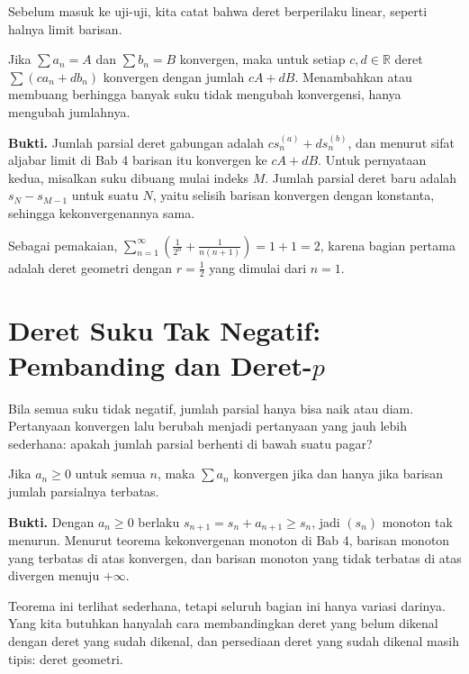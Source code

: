 Sebelum masuk ke uji-uji, kita catat bahwa deret berperilaku linear, seperti halnya
limit barisan.

\begin{proposisi}
Jika $\sum a_n = A$ dan $\sum b_n = B$ konvergen, maka untuk setiap $c, d \in
\mathbb{R}$ deret $\sum (c a_n + d b_n)$ konvergen dengan jumlah $cA + dB$.
Menambahkan atau membuang berhingga banyak suku tidak mengubah konvergensi, hanya
mengubah jumlahnya.
\end{proposisi}

\noindent\textbf{Bukti.} Jumlah parsial deret gabungan adalah $c s_n^{(a)} + d s_n^{(b)}$, dan menurut sifat
aljabar limit di Bab 4 barisan itu konvergen ke $cA + dB$. Untuk pernyataan kedua,
misalkan suku dibuang mulai indeks $M$. Jumlah parsial deret baru adalah
$s_{N} - s_{M-1}$ untuk suatu $N$, yaitu selisih barisan konvergen dengan konstanta,
sehingga kekonvergenannya sama.

Sebagai pemakaian, $\sum_{n=1}^{\infty} \left(\frac{1}{2^n} +
\frac{1}{n(n+1)}\right) = 1 + 1 = 2$, karena bagian pertama adalah deret geometri
dengan $r=\tfrac{1}{2}$ yang dimulai dari $n=1$.

\section{Deret Suku Tak Negatif: Pembanding dan Deret-$p$}

Bila semua suku tidak negatif, jumlah parsial hanya bisa naik atau diam. Pertanyaan
konvergen lalu berubah menjadi pertanyaan yang jauh lebih sederhana: apakah jumlah
parsial berhenti di bawah suatu pagar?

\begin{teorema}
Jika $a_n \ge 0$ untuk semua $n$, maka $\sum a_n$ konvergen jika dan hanya jika
barisan jumlah parsialnya terbatas.
\end{teorema}

\noindent\textbf{Bukti.} Dengan $a_n \ge 0$ berlaku $s_{n+1} = s_n + a_{n+1} \ge s_n$, jadi $(s_n)$ monoton
tak menurun. Menurut teorema kekonvergenan monoton di Bab 4, barisan monoton yang
terbatas di atas konvergen, dan barisan monoton yang tidak terbatas di atas divergen
menuju $+\infty$.

Teorema ini terlihat sederhana, tetapi seluruh bagian ini hanya variasi darinya. Yang
kita butuhkan hanyalah cara membandingkan deret yang belum dikenal dengan deret yang
sudah dikenal, dan persediaan deret yang sudah dikenal masih tipis: deret geometri.

